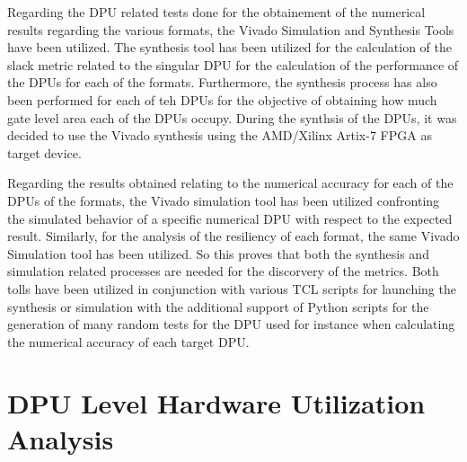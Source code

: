 Regarding the DPU related tests done for the obtainement of the numerical results regarding the various formats, the Vivado Simulation and Synthesis Tools have been utilized. The synthesis tool has been utilized for the calculation of the slack metric related to the singular DPU for the calculation of the performance of the DPUs for each of the formats. Furthermore, the synthesis process has also been performed for each of teh DPUs for the objective of obtaining how much gate level area each of the DPUs occupy. During the synthsis of the DPUs, it was decided to use the Vivado synthesis using the AMD/Xilinx Artix-7 FPGA as target device. 

Regarding the results obtained relating to the numerical accuracy for each of the DPUs of the formats, the Vivado simulation tool has been utilized confronting the simulated behavior of a specific numerical DPU with respect to the expected result. Similarly, for the analysis of the resiliency of each format, the same Vivado Simulation tool has been utilized. So this proves that both the synthesis and simulation related processes are needed for the discorvery of the metrics. Both tolls have been utilized in conjunction with various TCL scripts for launching the synthesis or simulation with the additional support of Python scripts for the generation of many random tests for the DPU used for instance when calculating the numerical accuracy of each target DPU. 

\section{DPU Level Hardware Utilization Analysis}




